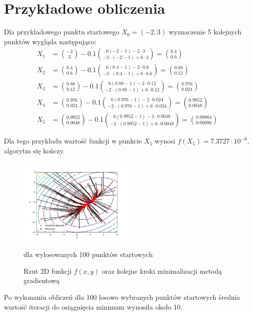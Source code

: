 \documentclass{article}
\begin{document}
\section{Przykładowe obliczenia}

Dla przykładowego punktu startowego $X_0 = (-2, 3)$
wyznaczenie 5 kolejnych punktów wygląda następująco:
\begin{equation*}
    \begin{aligned}
    X_1 &= {{-2} \choose {3}} - 0.1 {6(-2 - 1)-2\cdot3 \choose -2\cdot(-2-1)+6\cdot3} = {{0.4} \choose {0.6}} \\
    X_2 &= {{0.4} \choose {0.6}} - 0.1 {6(0.4 - 1)-2\cdot0.6 \choose -2\cdot(0.4-1)+6\cdot0.6} = {{0.88} \choose {0.12}} \\
    X_3 &= {{0.88} \choose {0.12}} - 0.1 {6(0.88 - 1)-2\cdot0.12 \choose -2\cdot(0.88-1)+6\cdot0.12} = {{0.976} \choose {0.024}} \\
    X_4 &= {{0.976} \choose {0.024}} - 0.1 {6(0.976 - 1)-2\cdot0.024 \choose -2\cdot(0.976-1)+6\cdot0.024} = {{0.9952} \choose {0.0048}} \\
    X_5 &= {{0.9952} \choose {0.0048}} - 0.1 {6(0.9952 - 1)-2\cdot0.0048 \choose -2\cdot(0.9952-1)+6\cdot0.0048} = {{0.99904} \choose {0.00096}}
    \end{aligned}
\end{equation*}

Dla tego przykładu wartość funkcji w punkcie $X_5$ wynosi $f(X_5) = 7.3727 \cdot 10^{-6}$,
algorytm się kończy.

\begin{figure}[H]
    \centering
    \includegraphics[width=0.5\textwidth]{plot.png}
    \caption{Rzut 2D funkcji $f(x, y)$ oraz kolejne kroki
    minimalizacji metodą gradientową} {dla wylosowanych 100 punktów startowych}
\end{figure}

Po wykonaniu obliczeń dla 100 losowo wybranych
punktów startowych średnia wartość
iteracji do osiągnięcia minimum wynosiła około 10.
\end{document}

